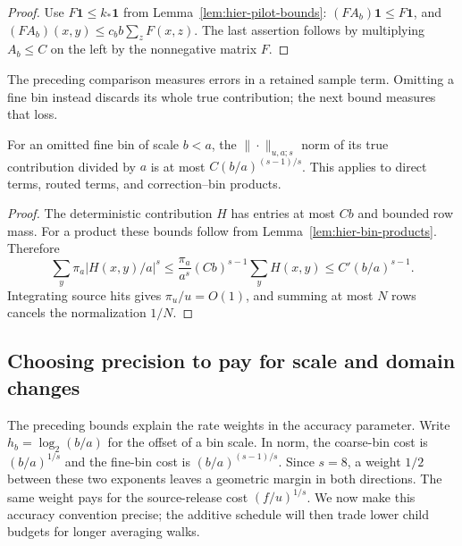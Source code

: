 \begin{proof}
Use $F\mathbf 1\leq k_*\mathbf 1$ from
Lemma~\ref{lem:hier-pilot-bounds}:
$(FA_b)\mathbf 1\leq F\mathbf 1$, and
$(FA_b)(x,y)\leq c_b b\sum_zF(x,z)$.  The last assertion follows by
multiplying $A_b\leq C$ on the left by the nonnegative matrix $F$.
\end{proof}

The preceding comparison measures errors in a retained sample term.
Omitting a fine bin instead discards its whole true contribution; the
next bound measures that loss.

\begin{lemma}\label{lem:est-omission}
For an omitted fine bin of scale $b<a$, the $\|\cdot\|_{u,a;s}$ norm
of its true contribution divided by $a$ is at most
$C(b/a)^{(s-1)/s}$.  This applies to direct terms, routed terms, and
correction--bin products.
\end{lemma}
\begin{proof}
The deterministic contribution $H$ has entries at most $Cb$ and bounded
row mass.  For a product these bounds follow from
Lemma~\ref{lem:hier-bin-products}.  Therefore
\[
 \sum_y\pi_a|H(x,y)/a|^s
 \le \frac{\pi_a}{a^s}(Cb)^{s-1}\sum_yH(x,y)
 \le C'(b/a)^{s-1}.
\]
Integrating source hits gives $\pi_u/u=O(1)$, and summing at most $N$ rows
cancels the normalization $1/N$.
\end{proof}

\subsection{Choosing precision to pay for scale and domain changes}
\label{subsec:est-precision}

The preceding bounds explain the rate weights in the accuracy parameter.
Write $h_b=\log_2(b/a)$ for the offset of a bin scale.
In norm, the coarse-bin cost is $(b/a)^{1/s}$ and the fine-bin cost is
$(b/a)^{(s-1)/s}$.  Since $s=8$, a weight $1/2$ between these two
exponents leaves a geometric margin in both directions.  The same
weight pays for the source-release cost $(f/u)^{1/s}$.  We now make
this accuracy convention precise; the additive schedule will then
trade lower child budgets for longer averaging walks.

